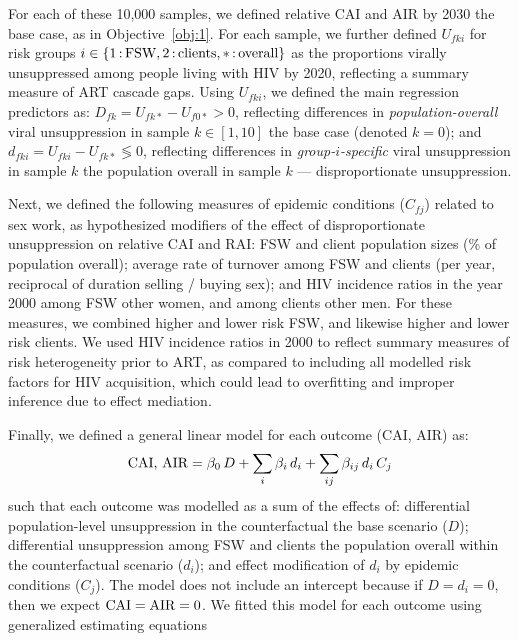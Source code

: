 \par
For each of these 10,000 samples, we defined
relative CAI and AIR by 2030 \vs the base case, as in Objective~\ref{obj:1}.
For each sample, we further defined
$U_{fki}$ for risk groups $i \in \{1{\,:\,}\textnormal{FSW}, 2{\,:\,}\textnormal{clients}, *{\,:\,}\textnormal{overall}\}$
as the proportions virally unsuppressed among people living with HIV by 2020,
reflecting a summary measure of ART cascade gaps.
Using $U_{fki}$, we defined the main regression predictors as:
$D_{fk} = U_{fk*} - U_{f0*} > 0$, reflecting differences in
\emph{population-overall} viral unsuppression in sample $k \in [1,10]$
\vs the base case (denoted $k = 0$); and
$d_{fki} = U_{fki} - U_{fk*} \lessgtr 0$, reflecting differences in
\emph{group-$i$-specific} viral unsuppression in sample $k$
\vs the population overall in sample $k$ --- \ie disproportionate unsuppression.
\par
Next, we defined the following measures of epidemic conditions ($C_{fj}$) related to sex work,
as hypothesized modifiers of the effect of disproportionate unsuppression on relative CAI and RAI:
FSW and client population sizes (\% of population overall);
average rate of turnover among FSW and clients (per year, reciprocal of duration selling / buying sex); and
HIV incidence ratios in the year 2000 among FSW \vs other women, and among clients \vs other men.
For these measures, we combined higher and lower risk FSW, and likewise higher and lower risk clients.
We used HIV incidence ratios in 2000 to reflect summary measures of risk heterogeneity prior to ART,
as compared to including all modelled risk factors for HIV acquisition,
which could lead to overfitting and improper inference due to effect mediation.
\par
Finally, we defined a general linear model for each outcome (CAI, AIR) as:
\begin{equation}\label{eq:art.glm}
  \textnormal{CAI, AIR} = \beta_0\,D
                 + \sum_i \beta_i\,d_i
                 + \sum_{ij} \beta_{ij}\,d_i\,C_j
\end{equation}
such that each outcome was modelled as a sum of the effects of:
differential population-level unsuppression in the counterfactual \vs the base scenario ($D$);
differential unsuppression among FSW and clients
\vs the population overall within the counterfactual scenario ($d_i$); and
effect modification of $d_i$ by epidemic conditions ($C_j$).
The model does not include an intercept because if $D = d_i = 0$,
then we expect $\textnormal{CAI} = \textnormal{AIR} = 0$.
We fitted this model for each outcome using generalized estimating equations \cite{Halekoh2006}
